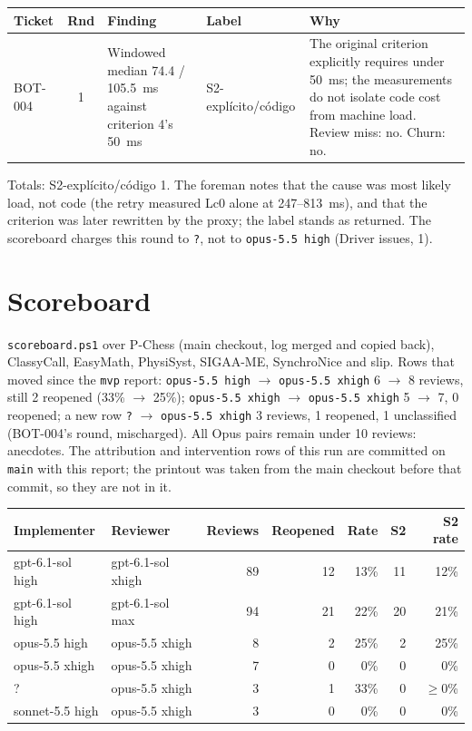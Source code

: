 \documentclass[11pt,a4paper]{article}
\begin{document}
{\small
\noindent\begin{tabularx}{\linewidth}{@{}lcXp{2.4cm}X@{}}
\toprule
Ticket & Rnd & Finding & Label & Why \\
\midrule
BOT-004 & 1 & Windowed median 74.4 / 105.5~ms against criterion 4's 50~ms & S2-explícito/\allowbreak código & The original criterion explicitly requires under 50~ms; the measurements do not isolate code cost from machine load. Review miss: no. Churn: no. \\
\bottomrule
\end{tabularx}
}

\smallskip
Totals: S2-explícito/código 1. The foreman notes that the cause was most likely load, not
code (the retry measured Lc0 alone at 247--813~ms), and that the criterion was later rewritten
by the proxy; the label stands as returned. The scoreboard charges this round to \texttt{?},
not to \texttt{opus-5.5 high} (Driver issues, 1).

\section*{Scoreboard}

\texttt{scoreboard.ps1} over P-Chess (main checkout, log merged and copied back), ClassyCall,
EasyMath, PhysiSyst, SIGAA-ME, SynchroNice and slip. Rows that moved since the \texttt{mvp}
report: \texttt{opus-5.5 high} $\rightarrow$ \texttt{opus-5.5 xhigh} 6 $\rightarrow$ 8
reviews, still 2 reopened (33\% $\rightarrow$ 25\%); \texttt{opus-5.5 xhigh} $\rightarrow$
\texttt{opus-5.5 xhigh} 5 $\rightarrow$ 7, 0 reopened; a new row \texttt{?} $\rightarrow$
\texttt{opus-5.5 xhigh} 3 reviews, 1 reopened, 1 unclassified (BOT-004's round, mischarged).
All Opus pairs remain under 10 reviews: anecdotes. The attribution and intervention rows of
this run are committed on \texttt{main} with this report; the printout was taken from the
main checkout before that commit, so they are not in it.

{\small
\begin{tabular}{@{}llrrrrr@{}}
\toprule
Implementer & Reviewer & Reviews & Reopened & Rate & S2 & S2 rate \\
\midrule
gpt-6.1-sol high & gpt-6.1-sol xhigh & 89 & 12 & 13\% & 11 & 12\% \\
gpt-6.1-sol high & gpt-6.1-sol max & 94 & 21 & 22\% & 20 & 21\% \\
opus-5.5 high & opus-5.5 xhigh & 8 & 2 & 25\% & 2 & 25\% \\
opus-5.5 xhigh & opus-5.5 xhigh & 7 & 0 & 0\% & 0 & 0\% \\
? & opus-5.5 xhigh & 3 & 1 & 33\% & 0 & $\geq$0\% \\
sonnet-5.5 high & opus-5.5 xhigh & 3 & 0 & 0\% & 0 & 0\% \\
\bottomrule
\end{tabular}
}
\end{document}
